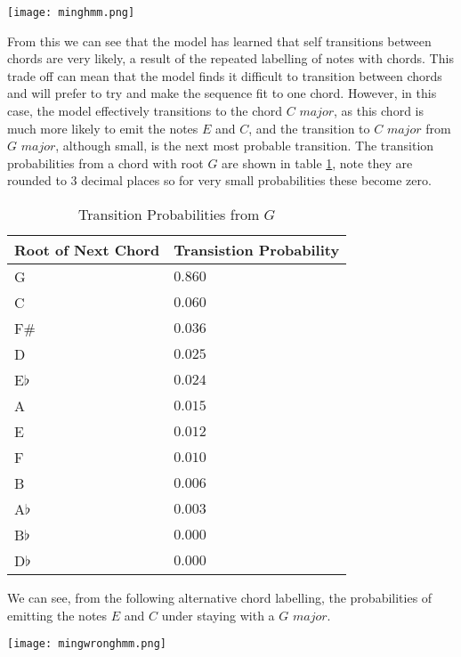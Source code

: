 \documentclass[bsc,singlespacing,logo, parskip, deptreport]{infthesis}
\begin{document}
\begin{center}
  \texttt{[image: minghmm.png]}
\end{center}

From this we can see that the model has learned that self transitions between chords are very likely, a result of the repeated labelling of notes with chords. This trade off can mean that the model finds it difficult to transition between chords and will prefer to try and make the sequence fit to one chord. However, in this case, the model effectively transitions to the chord $C$ $major$, as this chord is much more likely to emit the notes $E$ and $C$, and the transition to $C$ $major$ from $G$ $major$, although small, is the next most probable transition. The transition probabilities from a chord with root $G$ are shown in table \ref{trans}, note they are rounded to 3 decimal places so for very small probabilities these become zero.

\begin{table}[h!]
  \centering
  \caption{Transition Probabilities from $G$}
  \label{trans}
  \begin{tabular}{l|l}
    Root of Next Chord          & Transistion Probability \\ \hline
    G                   & $0.860$          \\
    C                   & $0.060$          \\
    F$\#$               & $0.036$          \\
    D                   & $0.025$          \\
    E$\flat$            & $0.024$          \\
    A                   & $0.015$          \\
    E                   & $0.012$          \\
    F                   & $0.010$          \\
    B                   & $0.006$          \\
    A$\flat$            & $0.003$          \\
    B$\flat$            & $0.000$          \\
    D$\flat$            & $0.000$
  \end{tabular}
\end{table}

We can see, from the following alternative chord labelling, the probabilities of emitting the notes $E$ and $C$ under staying with a $G$ $major$.

\begin{center}
  \texttt{[image: mingwronghmm.png]}
\end{center}
\end{document}
